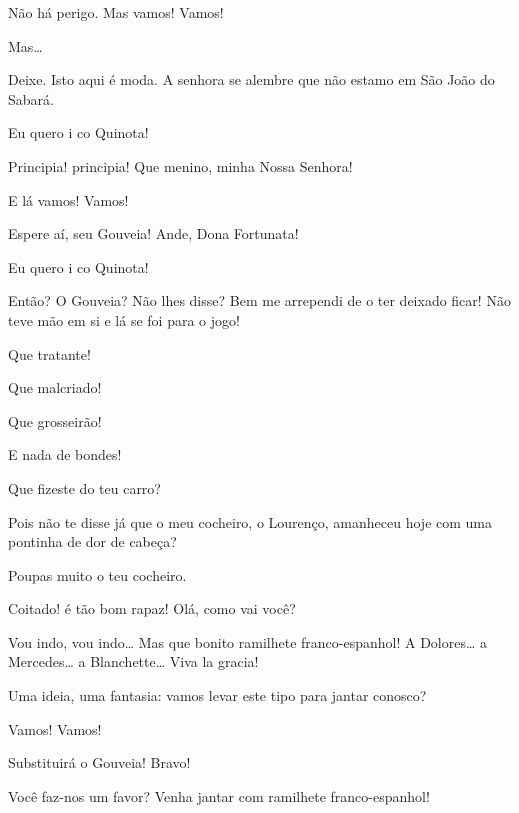  Não há perigo. Mas vamos! Vamos! 

  Mas\ldots{}

 Deixe. Isto aqui é moda. A senhora se alembre que não estamo em
São João do Sabará.

 Eu quero i co Quinota!

 Principia! principia! Que menino, minha Nossa Senhora!

  E lá vamos! Vamos! 

 Espere aí, seu Gouveia! Ande, Dona Fortunata!

  Eu quero i co Quinota! 


 Então? O Gouveia? Não lhes disse? Bem me arrependi de o ter deixado
ficar! Não teve mão em si e lá se foi para o jogo!

 Que tratante!

 Que malcriado!

 Que grosseirão!

 E nada de bondes!

 Que fizeste do teu carro?

 Pois não te disse já que o meu cocheiro, o Lourenço, amanheceu hoje
com uma pontinha de dor de cabeça?

  Poupas muito o teu cocheiro.

 Coitado! é tão bom rapaz!  Olá, como vai você?

  Vou indo, vou indo\ldots{} Mas que bonito ramilhete
franco-espanhol! A Dolores\ldots{} a Mercedes\ldots{} a Blanchette\ldots{} Viva la gracia!

  Uma ideia, uma fantasia: vamos levar este tipo para
jantar conosco?

 Vamos! Vamos!

 Substituirá o Gouveia! Bravo!

  Você faz-nos um favor? Venha jantar com ramilhete
franco-espanhol!

